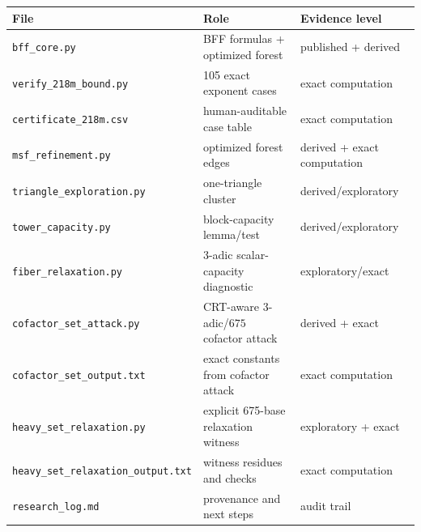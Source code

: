 \documentclass[11pt]{article}
\theoremstyle{definition}
\begin{document}
\begin{center}
\begin{tabular}{lll}
\toprule
File & Role & Evidence level\\
\midrule
\texttt{bff\_core.py} & BFF formulas + optimized forest & published + derived\\
\texttt{verify\_218m\_bound.py} & 105 exact exponent cases & exact computation\\
\texttt{certificate\_218m.csv} & human-auditable case table & exact computation\\
\texttt{msf\_refinement.py} & optimized forest edges & derived + exact computation\\
\texttt{triangle\_exploration.py} & one-triangle cluster & derived/exploratory\\
\texttt{tower\_capacity.py} & block-capacity lemma/test & derived/exploratory\\
\texttt{fiber\_relaxation.py} & 3-adic scalar-capacity diagnostic & exploratory/exact\\
\texttt{cofactor\_set\_attack.py} & CRT-aware 3-adic/$675$ cofactor attack & derived + exact\\
\texttt{cofactor\_set\_output.txt} & exact constants from cofactor attack & exact computation\\
\texttt{heavy\_set\_relaxation.py} & explicit 675-base relaxation witness & exploratory + exact\\
\texttt{heavy\_set\_relaxation\_output.txt} & witness residues and checks & exact computation\\
\texttt{research\_log.md} & provenance and next steps & audit trail\\
\bottomrule
\end{tabular}
\end{center}



\end{document}
